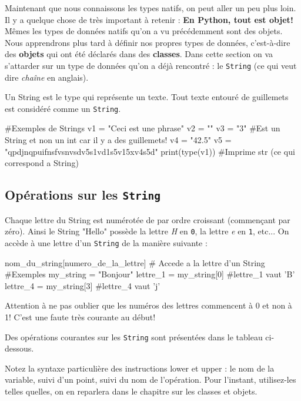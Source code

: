 Maintenant que nous connaissons les types natifs, on peut aller un peu plus loin. Il y a quelque chose de très important à retenir : \textbf{En Python, tout est objet!} Mêmes les types de données natifs qu'on a vu précédemment sont des objets. Nous apprendrons plus tard à définir nos propres types de données, c'est-à-dire des \textbf{objets} qui ont été déclarés dans des \textbf{classes}. Dans cette section on va s'attarder sur un type de données qu'on a déjà rencontré : le \texttt{String} (ce qui veut dire \textit{chaîne} en anglais).

Un String est le type qui représente un texte. Tout texte entouré de guillemets est considéré comme un \texttt{String}.

\begin{python}[caption = type \texttt{String}]
#Exemples de Strings
v1 = "Ceci est une phrase"
v2 = ""
v3 = "3" #Est un String et non un int car il y a des guillemets!
v4 = "42.5"
v5 = "qpdjnqpuifnsfvsnvsdv5s1vd1s5v15xv4s5d"
print(type(v1)) #Imprime str (ce qui correspond a String)
\end{python}

\subsection{Opérations sur les \texttt{String}}
Chaque lettre du String est numérotée de par ordre croissant (commençant par zéro). Ainsi le String "Hello" possède la lettre \textit{H} en \texttt{0}, la lettre \textit{e} en \texttt{1}, etc... On accède à une lettre d'un \texttt{String} de la manière suivante :

\begin{python}[caption = Accès à String]
nom_du_string[numero_de_la_lettre] # Accede a la lettre d'un String
#Exemples
my_string = "Bonjour"
lettre_1 = my_string[0] #lettre_1 vaut 'B'
lettre_4 = my_string[3] #lettre_4 vaut 'j'
\end{python}

Attention à ne pas oublier que les numéros des lettres commencent à 0 et non à 1! C'est une faute très courante au début!

Des opérations courantes sur les \texttt{String} sont présentées dans le tableau ci-dessous.

Notez la syntaxe particulière des instructions lower et upper : le nom de la variable, suivi d'un point, suivi du nom de l'opération. Pour l'instant, utilisez-les telles quelles, on en reparlera dans le chapitre sur les classes et objets.

